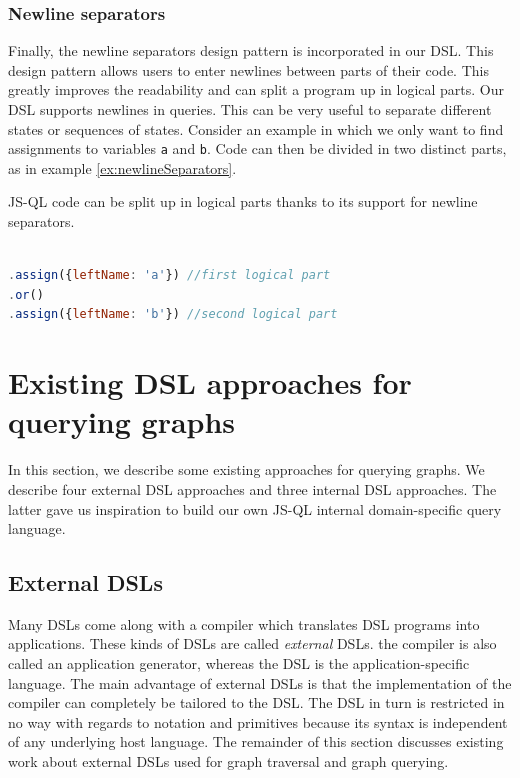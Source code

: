 \subsubsection*{Newline separators}

Finally, the newline separators design pattern is incorporated in our DSL. This design pattern allows users to enter newlines between parts of their code. This greatly improves the readability and can split a program up in logical parts. Our DSL supports newlines in queries. This can be very useful to separate different states or sequences of states. Consider an example in which we only want to find assignments to variables \texttt{a} and \texttt{b}. Code can then be divided in two distinct parts, as in example \ref{ex:newlineSeparators}.

\begin{exmp}
\label{ex:newlineSeparators}
JS-QL code can be split up in logical parts thanks to its support for newline separators.
\begin{lstlisting}[label={lst:newlineSeparators},language=JavaScript,caption=Newline separators,mathescape=true]  % float=t?

.assign({leftName: 'a'}) //first logical part
.or()
.assign({leftName: 'b'}) //second logical part
\end{lstlisting}
\end{exmp}


\section{Existing DSL approaches for querying graphs}

In this section, we describe some existing approaches for querying graphs. We describe four external DSL approaches and three internal DSL approaches. The latter gave us inspiration to build our own JS-QL internal domain-specific query language.

\subsection{External DSLs}

Many DSLs come along with a compiler which translates DSL programs into applications. These kinds of DSLs are called \textit{external} DSLs. the compiler is also called an application generator\cite{Cleaveland:1988}, whereas the DSL is the application-specific language. The main advantage of external DSLs is that the implementation of the compiler can completely be tailored to the DSL. The DSL in turn is restricted in no way with regards to notation and primitives because its syntax is independent of any underlying host language. The remainder of this section discusses existing work about external DSLs used for graph traversal and graph querying.

